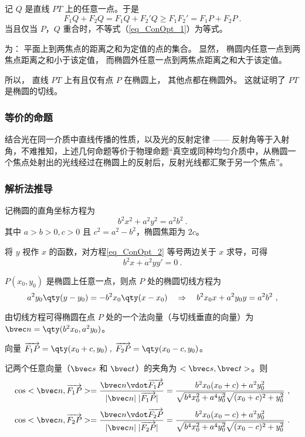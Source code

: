 记 $Q$ 是直线 $PT$ 上的任意一点。于是
\begin{equation}\label{eq_ConOpt_1}
F_1Q + F_2Q = F_1Q + F_2'Q \geqslant F_1F_2' = F_1P + F_2P~.
\end{equation}
当且仅当 $P$，$Q$ 重合时，不等式（\autoref{eq_ConOpt_1}）为等式。

为：
平面上到两焦点的距离之和为定值的点的集合。 显然， 椭圆内任意一点到两焦点距离之和小于该定值， 而椭圆外任意一点到两焦点距离之和大于该定值。 

所以， 直线 $PT$ 上有且仅有点 $P$ 在椭圆上， 其他点都在椭圆外。 这就证明了 $PT$ 是椭圆的切线。

\subsubsection{等价的命题}
结合光在同一介质中直线传播的性质，以及光的反射定律 —— 反射角等于入射角，不难推知，上述几何命题等价于物理命题“真空或同种均匀介质中，从椭圆一个焦点处射出的光线经过在椭圆上的反射后，反射光线都汇聚于另一个焦点”。

\subsubsection{解析法推导}
记椭圆的直角坐标方程为
\begin{equation}\label{eq_ConOpt_2}
b^2 x^2 +a^2 y^2=a^2 b^2~.
\end{equation}
其中 $a>b>0,c>0$ 且 $c^2=a^2-b^2$，椭圆焦距为 $2c$。

将 $y$ 视作 $x$ 的函数，对方程\autoref{eq_ConOpt_2} 等号两边关于 $x$ 求导，可得
\begin{equation}
b^2 x +a^2 yy'= 0~.
\end{equation}

$P(x_0,y_0)$ 是椭圆上任意一点，则点 $P$ 处的椭圆切线方程为
\begin{equation}
a^2 y_0 \qty(y - y_0) = - b^2 x_0 \qty(x - x_0) \quad
\Rightarrow \quad
b^2 x_0 x + a^2 y_0 y = a^2 b^2~,
\end{equation}

由切线方程可得椭圆在点 $P$ 处的一个法向量（与切线垂直的向量）为 $\bvec n = \qty(b^2 x_0,a^2 y_0)$。

向量 $\overrightarrow{F_1P}=\qty(x_0 +c,y_0)\; ,\; \overrightarrow{F_2P}=\qty(x_0 -c,y_0)$。

记两个任意向量（$\bvec s$ 和 $\bvec t$）的夹角为 $<\bvec s,\bvec t>$。则
\begin{equation}\label{eq_ConOpt_5}
\cos<\bvec n,\overrightarrow{F_1P}>=\frac{\bvec n \vdot \overrightarrow{F_1P}}{|\bvec n| \; |\overrightarrow{F_1P}|}= \frac{b^2 x_0 (x_0+c)+a^2 y_0^2}{\sqrt{b^4 x_0^2+a^4 y_0^2}\sqrt{(x_0+c)^2+y_0^2}}~,
\end{equation}
\begin{equation}\label{eq_ConOpt_6}
\cos<\bvec n,\overrightarrow{F_2P}>=\frac{\bvec n \vdot \overrightarrow{F_2P}}{|\bvec n| \; |\overrightarrow{F_2P}|}= \frac{b^2 x_0 (x_0-c)+a^2 y_0^2}{\sqrt{b^4 x_0^2+a^4 y_0^2}\sqrt{(x_0-c)^2+y_0^2}}~.
\end{equation}

